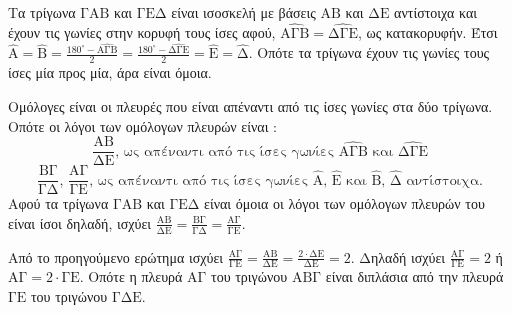 \begin{alist}
\item [α.] Τα τρίγωνα $\text{ΓΑΒ}$ και $\text{ΓΕΔ}$ είναι ισοσκελή με βάσεις $\text{ΑΒ}$ και $\text{ΔΕ}$ αντίστοιχα και έχουν τις γωνίες στην κορυφή τους ίσες αφού, $\widehat{\text{ΑΓΒ}} = \widehat{\text{ΔΓΕ}}$, ως κατακορυφήν. Έτσι $\widehat{\text{Α}} = \widehat{\text{Β}} = \frac{180^\circ - \widehat{\text{ΑΓΒ}}}{2} = \frac{180^\circ - \widehat{\text{ΔΓΕ}}}{2} = \widehat{\text{Ε}} = \widehat{\text{Δ}}$. Οπότε τα τρίγωνα έχουν τις γωνίες τους ίσες μία προς μία, άρα είναι όμοια.
\item [β.]
    \begin{rlist}
    \item [i.] Ομόλογες είναι οι πλευρές που είναι απέναντι από τις ίσες γωνίες στα δύο τρίγωνα. Οπότε οι λόγοι των ομόλογων πλευρών είναι :
    \[ \frac{\text{AB}}{\text{ΔΕ}} \text{, ως απέναντι από τις ίσες γωνίες } \widehat{\text{ΑΓΒ}} \text{ και } \widehat{\text{ΔΓΕ}} \]
    \[ \frac{\text{ΒΓ}}{\text{ΓΔ}} \text{, } \frac{\text{ΑΓ}}{\text{ΓΕ}} \text{, ως απέναντι από τις ίσες γωνίες } \widehat{\text{A}} \text{, } \widehat{\text{E}} \text{ και } \widehat{\text{B}} \text{, } \widehat{\text{Δ}} \text{ αντίστοιχα.} \]
    Αφού τα τρίγωνα $\text{ΓΑΒ}$ και $\text{ΓΕΔ}$ είναι όμοια οι λόγοι των ομόλογων πλευρών του είναι ίσοι δηλαδή, ισχύει $\frac{\text{AB}}{\text{ΔΕ}} = \frac{\text{ΒΓ}}{\text{ΓΔ}} = \frac{\text{ΑΓ}}{\text{ΓΕ}}$.
    \item [ii.] Από το προηγούμενο ερώτημα ισχύει $\frac{\text{ΑΓ}}{\text{ΓΕ}} = \frac{\text{ΑΒ}}{\text{ΔΕ}} = \frac{2 \cdot \text{ΔΕ}}{\text{ΔΕ}} = 2$. Δηλαδή ισχύει $\frac{\text{ΑΓ}}{\text{ΓΕ}} = 2$ ή $\text{ΑΓ} = 2 \cdot \text{ΓΕ}$. Οπότε η πλευρά $\text{ΑΓ}$ του τριγώνου $\text{ΑΒΓ}$ είναι διπλάσια από την πλευρά $\text{ΓΕ}$ του τριγώνου $\text{ΓΔΕ}$.
    \end{rlist}
\end{alist}